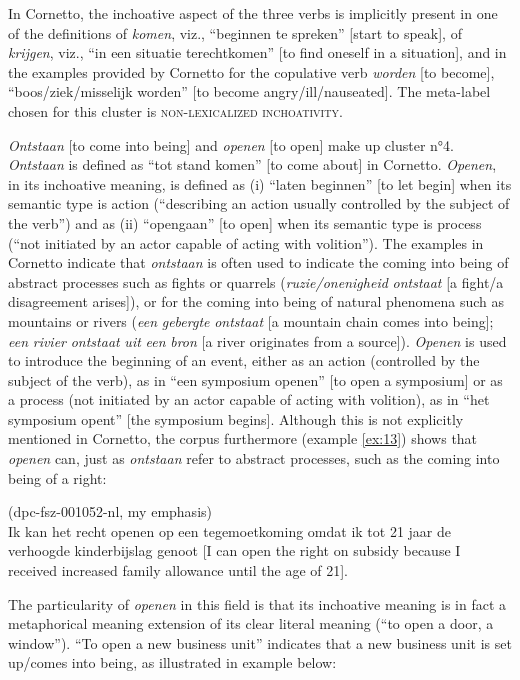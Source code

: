 In Cornetto, the inchoative aspect of the three verbs is implicitly present in one of the definitions of \textit{komen}, viz., “beginnen te spreken” [start to speak], of \textit{krijgen}, viz., “in een situatie terechtkomen” [to find oneself in a situation], and in the examples provided by Cornetto for the copulative verb \textit{worden} [to become], “boos\slash ziek/misselijk worden” [to become angry\slash ill/nauseated]. The meta-label chosen for this cluster is \textsc{non-lexicalized inchoativity}.

\textit{Ontstaan} [to come into being] and \textit{openen} [to open] make up cluster n°4. \textit{Ontstaan} is defined as “tot stand komen” [to come about] in Cornetto. \textit{Openen}, in its inchoative meaning, is defined as (i) “laten beginnen” [to let begin] when its semantic type is action (“describing an action usually controlled by the subject of the verb”) and as (ii) “opengaan” [to open] when its semantic type is process (“not initiated by an actor capable of acting with volition”). The examples in Cornetto indicate that \textit{ontstaan} is often used to indicate the coming into being of abstract processes such as fights or quarrels (\textit{ruzie\slash onenigheid} \textit{ontstaat} [a fight\slash a disagreement arises]), or for the coming into being of natural phenomena such as mountains or rivers (\textit{een} \textit{gebergte} \textit{ontstaat} [a mountain chain comes into being]; \textit{een} \textit{rivier} \textit{ontstaat} \textit{uit} \textit{een} \textit{bron} [a river originates from a source]). \textit{Openen} is used to introduce the beginning of an event, either as an action (controlled by the subject of the verb), as in “een symposium openen” [to open a symposium] or as a process (not initiated by an actor capable of acting with volition), as in “het symposium opent” [the symposium begins]. Although this is not explicitly mentioned in Cornetto, the corpus furthermore (example \ref{ex:13}) shows that \textit{openen} can, just as \textit{ontstaan} refer to abstract processes, such as the coming into being of a right:

\ea\label{ex:13}(dpc-fsz-001052-nl, my emphasis)\\
Ik kan het recht openen op een tegemoetkoming omdat ik tot 21 jaar de verhoogde kinderbijslag genoot [I can open the right on subsidy because I received increased family allowance until the age of 21].
\z

The particularity of \textit{openen} in this field is that its inchoative meaning is in fact a metaphorical meaning extension of its clear literal meaning (“to open a door, a window”). “To open a new business unit” indicates that a new business unit is set up\slash comes into being, as illustrated in example  below:

